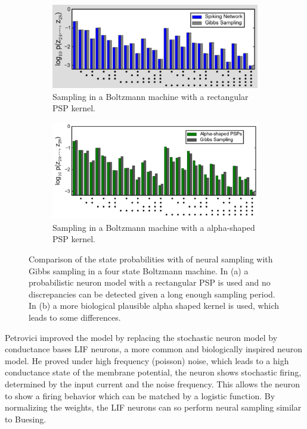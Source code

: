 \begin{figure}
	\centering
	\begin{subfigure}[t]{.50\textwidth}
  		\centering
  		\includegraphics[width=.8\linewidth]{imgs/snn_sample3.png}
  		\caption{Sampling in a Boltzmann machine with a rectangular PSP kernel.}
  		\label{fig:sub1}
	\end{subfigure}%
	\begin{subfigure}[t]{.50\textwidth}
  		\centering
  		\includegraphics[width=.8\linewidth]{imgs/snn_sample4.png}
  		\caption{Sampling in a Boltzmann machine with a alpha-shaped PSP kernel. }
  		\label{fig:sub2}
	\end{subfigure}
	\caption{Comparison of the state probabilities with of neural sampling with Gibbs sampling in a four state Boltzmann machine. In (a) a probabilistic neuron model with a rectangular PSP is used and no discrepancies can be detected given a long enough sampling period. In (b) a more biological plausible alpha shaped kernel is used, which leads to some differences.}
	\label{fig:snnsamp3}
\end{figure}

Petrovici improved the model by replacing the stochastic neuron model by conductance bases LIF neurons, a more common and biologically inspired neuron model.
He proved under high frequency (poisson) noise, which leads to a high conductance state of the membrane potential, the neuron shows stochastic firing, determined by the input current and the noise frequency.
This allows the neuron to show a firing behavior which can be matched by a logistic function.  
By normalizing the weights, the LIF neurons can so perform neural sampling similar to Buesing.


